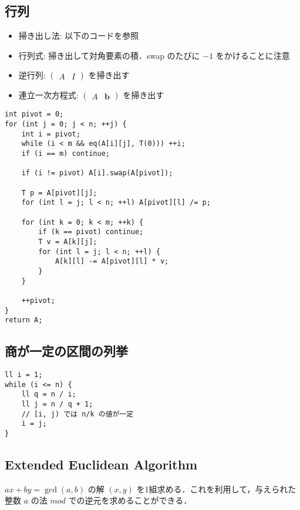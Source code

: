 \subsection{行列}

\begin{small}
\begin{itemize}
    \item 掃き出し法: 以下のコードを参照
    \item 行列式: 掃き出して対角要素の積．swap のたびに $-1$ をかけることに注意
    \item 逆行列: $\begin{pmatrix}A & I\end{pmatrix}$ を掃き出す
    \item 連立一次方程式: $\begin{pmatrix}A & \boldsymbol{b}\end{pmatrix}$ を掃き出す
\end{itemize}
\end{small}

\begin{lstlisting}
int pivot = 0;
for (int j = 0; j < n; ++j) {
    int i = pivot;
    while (i < m && eq(A[i][j], T(0))) ++i;
    if (i == m) continue;

    if (i != pivot) A[i].swap(A[pivot]);

    T p = A[pivot][j];
    for (int l = j; l < n; ++l) A[pivot][l] /= p;

    for (int k = 0; k < m; ++k) {
        if (k == pivot) continue;
        T v = A[k][j];
        for (int l = j; l < n; ++l) {
            A[k][l] -= A[pivot][l] * v;
        }
    }

    ++pivot;
}
return A;
\end{lstlisting}

\subsection{商が一定の区間の列挙}

\begin{lstlisting}
ll i = 1;
while (i <= n) {
    ll q = n / i;
    ll j = n / q + 1;
    // [i, j) では n/k の値が一定
    i = j;
}
\end{lstlisting}

\subsection{Extended Euclidean Algorithm}

\begin{small}
$ax + by = \gcd(a, b)$ の解 $(x, y)$ を1組求める．これを利用して，与えられた整数 $a$ の法 $mod$ での逆元を求めることができる．
\end{small}

